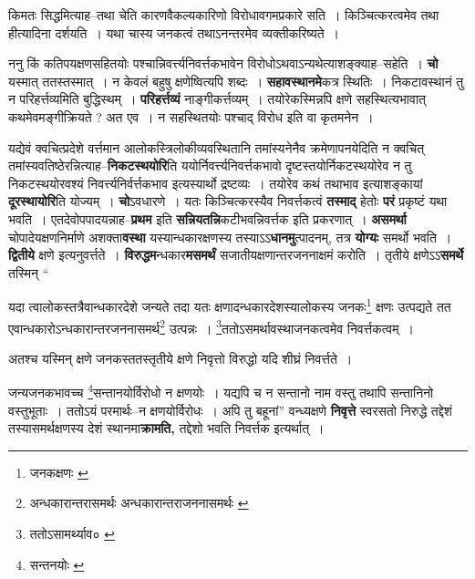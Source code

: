\documentclass[article,12pt,a4paper]{memoir}
\begin{document}
	  \endgroup
	

	  \pstart किमतः सिद्धमित्याह--तथा चेति कारणवैकल्यकारिणो विरोधावगमप्रकारे सति । किञ्चित्करत्वमेव तथा हीत्यादिना दर्शयति । यथा चास्य जनकत्वं तथाऽनन्तरमेव व्यक्तीकरिष्यते ।
	\pend
      

	  \pstart ननु किं कतिपयक्षणसहितयोः पश्चान्निवर्त्त्यनिवर्त्तकभावेन विरोधोऽथवाऽन्यथेत्याशङ्क्याह--सहेति । \textbf{चो} यस्मात् ततस्तस्मात् । न केवलं बहुषु क्षणेष्वित्यपि शब्दः । \textbf{सहावस्थानमे}कत्र स्थितिः । निकटावस्थानं तु न परिहर्त्तव्यमिति बुद्धिस्थम् । \textbf{परिहर्त्तव्यं} नाङ्गीकर्त्तव्यम् । तयोरेकस्मिन्नपि क्षणे सहस्थित्यभावात् कथमेवमङ्गीक्रियते ? अत एव । न सहस्थितयोः पश्चाद् विरोध इति वा कृतमनेन ।
	\pend
      

	  \pstart यद्येवं क्वचित्प्रदेशे वर्त्तमान आलोकस्त्रिलोकीव्यवस्थितानि तमांस्यनेनैव क्रमेणापनयेदिति न क्वचित् तमांस्यवतिष्ठेरन्नित्याह--\textbf{निकटस्थयोरि}ति ययोर्निवर्त्त्यनिवर्त्तकभावो दृष्टस्तयोर्निकटस्थयोरेव न तु निकटस्थयोरवश्यं निवर्त्त्यनिर्वर्त्तकभाव इत्यस्यार्थो द्रष्टव्यः । तयोरेव कथं तथाभाव इत्याशङ्कायां \textbf{दूरस्थायोरि}ति योज्यम् । \textbf{चो}ऽवधारणे । यतः किञ्चित्करस्यैव निवर्त्तकत्वं \textbf{तस्माद्} हेतोः \textbf{परं} प्रकृष्टं यथा भवति । एतदेवोपपादयन्नाह--\textbf{प्रथम} इति \textbf{सन्नियतन्नि}कटीभवन्निवर्त्तक इति प्रकरणात् । \textbf{असमर्था} चोपादेयक्षणनिर्माणे अशक्ता\textbf{वस्था} यस्यान्धकारक्षणस्य तस्याऽऽ\textbf{धानमु}त्पादनम्, तत्र \textbf{योग्यः} समर्थो भवति । \textbf{द्वितीये} क्षणे इत्यनुवर्त्तते । \textbf{विरुद्धम}न्धकार\textbf{मसमर्थं} सजातीयक्षणान्तरजननाक्षमं करोति । तृतीये क्षणेऽऽ\textbf{समर्थे} तस्मिन्  \leavevmode{} “
	  
	यदा त्वालोकस्तत्रैवान्धकारदेशे जन्यते तदा यतः क्षणादन्धकारदेशस्यालोकस्य जनकः\footnote{जनकक्षणः \cite{dp-msA} \cite{dp-msB} \cite{dp-edP} \cite{dp-edH} \cite{dp-edE} \cite{dp-edN}} क्षणः उत्पद्यते तत एवान्धकारोऽन्धकारान्तरजननासमर्थ\footnote{अन्धकारान्तरासमर्थः \cite{dp-msA} अन्धकारान्तराजननासमर्थः \cite{dp-msB} \cite{dp-msC}} उत्पन्नः । \footnote{ततोऽसामर्थ्याव० \cite{dp-msB}}ततोऽसमर्थावस्थाजनकत्वमेव निवर्त्तकत्वम् । 
	  
	अतश्च यस्मिन् क्षणे जनकस्ततस्तृतीये क्षणे निवृत्तो विरुद्धो यदि शीघ्रं निवर्त्तते । 
	  
	जन्यजनकभावच्च \footnote{सन्तनयोः \cite{dp-msA}}सन्तानयोर्विरोधो न क्षणयोः । यद्यपि च न सन्तानो नाम वस्तु तथापि सन्तानिनो वस्तुभूताः । ततोऽयं परमार्थः--न क्षणयोर्विरोधः । अपि तु बहूनां” वन्ध्यक्षणे \textbf{निवृत्ते} स्वरसतो निरुद्धे तद्देशं तस्यासमर्थक्षणस्य देशं स्थानमा\textbf{क्रामति,} तद्देशो भवति निवर्त्तक इत्यर्थात् ।
	\pend
      
\end{document}
